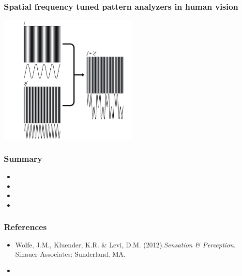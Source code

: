 \documentclass[]{beamer}
\begin{document}
\begin{frame}
 \frametitle{Spatial frequency tuned pattern analyzers in human vision}
\begin{center}
\includegraphics[width=70mm]{figs/l3/graham_nachmias.jpg}
\end{center}
\end{frame}


\begin{frame}
 \frametitle{Summary}
\begin{itemize}
\setlength{\itemsep}{5pt}
 \item 
 \item 
 \item 
 \item 
\end{itemize}

\end{frame}




\begin{frame}
 \frametitle{References}
\begin{small}
\begin{itemize}
 \item  Wolfe, J.M., Kluender, K.R. \& Levi, D.M. (2012).\textit{Sensation \& Perception}. Sinauer Associates: Sunderland, MA. 
 \item 
\end{itemize}
\end{small}
\end{frame}
\end{document}
